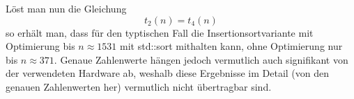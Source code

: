 Löst man nun die Gleichung 
\begin{equation}
  t_2(n)=t_4(n)
\end{equation}
so erhält man, dass für den typtischen Fall die Insertionsortvariante mit Optimierung bis $n\approx1531$ mit std::sort mithalten kann, ohne Optimierung nur bis $n\approx371$.
Genaue Zahlenwerte hängen jedoch vermutlich auch signifikant von der verwendeten Hardware ab, weshalb diese Ergebnisse im Detail (von den genauen Zahlenwerten her) vermutlich nicht übertragbar sind.

